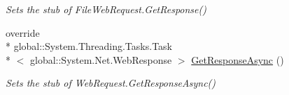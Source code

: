 \begin{DoxyCompactItemize}
\begin{DoxyCompactList}\small\item\em Sets the stub of File\-Web\-Request.\-Get\-Response()\end{DoxyCompactList}\item 
override \\*
global\-::\-System.\-Threading.\-Tasks.\-Task\\*
$<$ global\-::\-System.\-Net.\-Web\-Response $>$ \hyperlink{class_system_1_1_net_1_1_fakes_1_1_stub_file_web_request_a48cfff16ad2337839790f8f509cfa3d0}{Get\-Response\-Async} ()
\begin{DoxyCompactList}\small\item\em Sets the stub of Web\-Request.\-Get\-Response\-Async()\end{DoxyCompactList}\end{DoxyCompactItemize}
